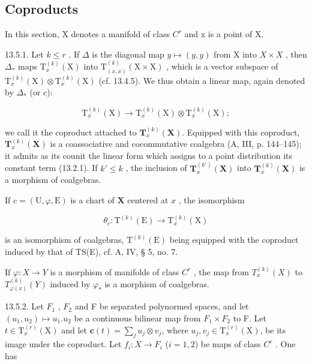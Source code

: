 \subsection{Coproducts}

In this section, X denotes a manifold of class \(C^{r}\) and x is a point of X.

13.5.1. Let \(k \leqslant r\) . If \(\Delta\) is the diagonal map \(y \mapsto (y, y)\) from X into \(X \times X\) , then \(\Delta_*\) maps \(\mathrm{T}_x^{(k)}(\mathrm{X})\) into \(\mathrm{T}_{(x,x)}^{(k)}(\mathrm{X} \times \mathrm{X})\) , which is a vector subspace of \(\mathrm{T}_{x}^{(k)}(\mathrm{X})\otimes\mathrm{T}_{x}^{(k)}(\mathrm{X})\) (cf. 13.4.5). We thus obtain a linear map, again denoted by \(\Delta_{*}\) (or \(c\)):

\[
\mathrm{T} _ {x} ^ {(k)} (\mathrm{X}) \rightarrow \mathrm{T} _ {x} ^ {(k)} (\mathrm{X}) \otimes \mathrm{T} _ {x} ^ {(k)} (\mathrm{X});
\]

we call it the coproduct attached to \(\mathbf{T}_{x}^{(k)}(\mathbf{X})\). Equipped with this coproduct, \(\mathbf{T}_{x}^{(k)}(\mathbf{X})\) is a coassociative and cocommutative coalgebra (A, III, p. 144–145); it admits as its counit the linear form which assigns to a point distribution its constant term (13.2.1). If \(k' \leqslant k\) , the inclusion of \(\mathbf{T}_{x}^{(k')}(\mathbf{X})\) into \(\mathbf{T}_{x}^{(k)}(\mathbf{X})\) is a morphism of coalgebras.

If \(c = (\mathrm{U},\varphi ,\mathrm{E})\) is a chart of \(\mathbf{X}\) centered at \(x\) , the isomorphism

\[
\theta_ {c} \colon \mathrm{T} ^ {(k)} (\mathrm{E}) \rightarrow \mathrm{T} _ {x} ^ {(k)} (\mathrm{X})
\]

is an isomorphism of coalgebras, \(\mathrm{T}^{(k)}(\mathrm{E})\) being equipped with the coproduct induced by that of TS(E), cf. A, IV, § 5, no. 7.

If \(\varphi: X \to Y\) is a morphism of manifolds of class \(C^r\) , the map from \(T_x^{(k)}(X)\) to \(T_{\varphi(x)}^{(k)}(Y)\) induced by \(\varphi_*\) is a morphism of coalgebras.

13.5.2. Let \(F_{1}\) , \(F_{2}\) and F be separated polynormed spaces, and let \((u_{1}, u_{2}) \mapsto u_{1}.u_{2}\) be a continuous bilinear map from \(F_{1} \times F_{2}\) to F. Let \(t \in \mathrm{T}_{x}^{(r)}(\mathrm{X})\) and let \(\boldsymbol{c}(t) = \sum_{j} u_{j} \otimes v_{j}\), where \(u_{j},v_{j} \in \mathrm{T}_{x}^{(r)}(\mathrm{X})\), be its image under the coproduct. Let \(f_{i}: X \to F_{i}\) (\(i=1,2\)) be maps of class \(C^{r}\) . One has

